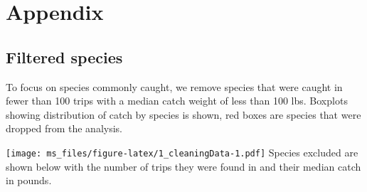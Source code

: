 \documentclass[]{article}
\begin{document}
\section{Appendix}\label{appendix}

\subsection{Filtered species}\label{filtered-species}

To focus on species commonly caught, we remove species that were caught
in fewer than 100 trips with a median catch weight of less than 100 lbs.
Boxplots showing distribution of catch by species is shown, red boxes
are species that were dropped from the analysis.

\texttt{[image: ms\_files/figure-latex/1\_cleaningData-1.pdf]} Species
excluded are shown below with the number of trips they were found in and
their median catch in pounds.
\end{document}
